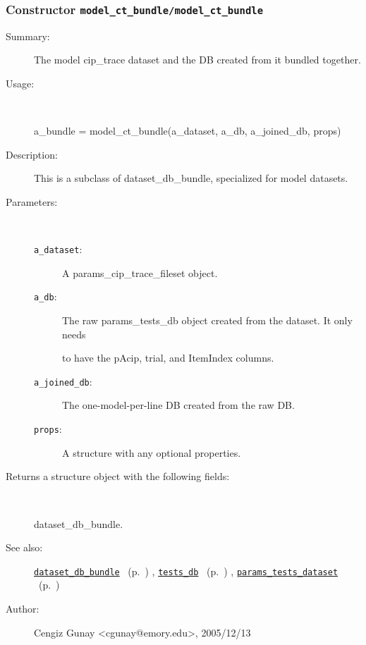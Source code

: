 \subsubsection[Constructor \texttt{model\_ct\_bundle}]{Constructor \texttt{model\_ct\_bundle/model\_ct\_bundle}}%
%
\label{ref_model_ct_bundle__model_ct_bundle}%
\hypertarget{ref_model_ct_bundle__model_ct_bundle}{}%
\begin{description}
\item[Summary:]The model cip\_trace dataset and the DB created from it bundled together.
%
\item[Usage:]~%
\begin{lyxcode}%
a\_bundle = model\_ct\_bundle(a\_dataset, a\_db, a\_joined\_db, props)
%
\end{lyxcode}%
%
\item[Description:]%
This is a subclass of dataset\_db\_bundle, specialized for model datasets. 
\item[Parameters:]~
\begin{description}%
\item[\texttt{a\_dataset}:]
 A params\_cip\_trace\_fileset object.
\item[\texttt{a\_db}:]
 The raw params\_tests\_db object created from the dataset. It only needs

to have the pAcip, trial, and ItemIndex columns.\item[\texttt{a\_joined\_db}:]
 The one-model-per-line DB created from the raw DB.
\item[\texttt{props}:]
 A structure with any optional properties.
\end{description}%
%
\item[Returns a structure object with the following fields:]~

	dataset\_db\_bundle.
%
%
\item[See also:]%
\hyperlink{ref_dataset_db_bundle}{\texttt{dataset\_db\_bundle}}%
\ (p.~\pageref{ref_dataset_db_bundle})%
%
, \hyperlink{ref_tests_db}{\texttt{tests\_db}}%
\ (p.~\pageref{ref_tests_db})%
%
, \hyperlink{ref_params_tests_dataset}{\texttt{params\_tests\_dataset}}%
\ (p.~\pageref{ref_params_tests_dataset})%
%
%
\item[Author:]%
Cengiz Gunay <cgunay@emory.edu>, 2005/12/13%
\end{description}
\methodline%
